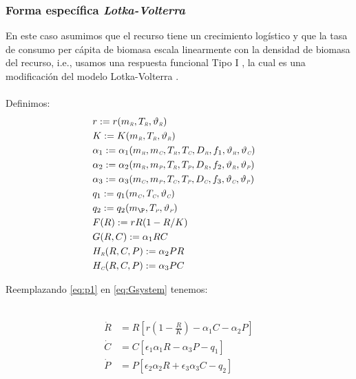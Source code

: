 \subsubsection{Forma espec\'ifica  \emph{Lotka-Volterra}}
En este caso asumimos que el recurso tiene un crecimiento log\'istico y que la tasa de consumo per c\'apita de biomasa escala linearmente con la densidad de biomasa del recurso, i.e., usamos una respuesta funcional Tipo I \citep{gotelliprimer}, la cual es una modificaci\'on del modelo Lotka-Volterra \citep{gotelliprimer}.\\
\mbox{}\\
Definimos:
\begin{equation}\label{eq:p1}
\begin{aligned}
&r := r(m_\R,T_\R,\vartheta_\R)&\\ 
&K := K(m_\R,T_\R,\vartheta_\R)&\\
&\alpha_{1} := \alpha_{1}(m_\R,m_\C,T_\R,T_\C,D_\R,f_1,\vartheta_\R,\vartheta_\C)&\\
&\alpha_{2} := \alpha_{2}(m_\R,m_\PP,T_\R,T_\PP,D_\R,f_2,\vartheta_\R,\vartheta_\PP)&\\
&\alpha_{3} := \alpha_{3}(m_\C,m_\PP,T_\C,T_\PP,D_\C,f_3,\vartheta_\C,\vartheta_\PP)& \\
&q_1 := q_1(m_\C,T_\C,\vartheta_\C)& \\ 
&q_2 := q_2(m_\P,T_\PP,\vartheta_\PP)&\\
&F(R):= rR(1-R/K)& \\
&G(R,C):= \alpha_1 RC &\\ 
&H_{\R}(R,C,P):= \alpha_2PR&\\
&H_{\C}(R,C,P):= \alpha_3PC&
\end{aligned}
\end{equation}

Reemplazando \eqref{eq:p1} en \eqref{eq:Gsystem} tenemos:

\
\begin{equation}
\begin{aligned} 
\dot{R} &= R\left[ r(1-\frac{R}{K})- \alpha_1 C -\alpha_2 P \right] \\
\dot{C} &= C \left[ \epsilon_1 \alpha_1 R - \alpha_3  P - q_1 \right] \\
\dot{P} &= P \left[ \epsilon_2 \alpha_2 R + \epsilon_3 \alpha_3 C - q_2 \right]
\end{aligned}
\end{equation}

